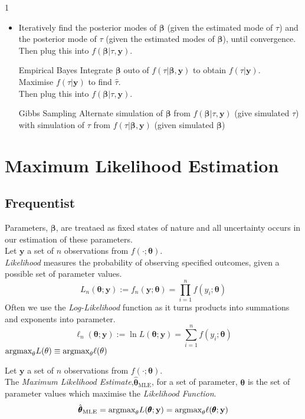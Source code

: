 \documentclass[11pt,a4paper]{article}
\begin{document}
1
\begin{itemize}
	\item Iteratively find the posterior modes of $\pmb\beta$ (given the estimated mode of $\tau$) and the posterior mode of $\tau$ (given the estimated modes of $\pmb\beta$), until convergence.\\
	Then plug this into $f(\pmb\beta|\tau,\textbf{y})$.
	\item[Empirical Bayes] Integrate $\pmb\beta$ outo of $f(\tau|\pmb\beta,\textbf{y})$ to obtain $f(\tau|\textbf{y})$.\\
	Maximise $f(\tau|\textbf{y})$ to find $\hat\tau$.\\
	Then plug this into $f(\pmb\beta|\tau,\textbf{y})$.
	\item[Gibbs Sampling] Alternate simulation of $\pmb\beta$ from $f(\pmb\beta|\tau,\textbf{y})$ (give simulated $\tau$) with simulation of $\tau$ from $f(\tau|\pmb\beta,\textbf{y})$ (given simulated $\pmb\beta$)
\end{itemize}

\section{Maximum Likelihood Estimation}

\subsection{Frequentist}

Parameters, $\pmb\beta$, are treataed as fixed states of nature and all uncertainty occurs in our estimation of these parameters.\\

Let $\textbf{y}$ a set of $n$ observations from $f(\cdot;\pmb\theta)$.\\
\textit{Likelihood} measures the probability of observing specified outcomes, given a possible set of parameter values.
$$L_n(\pmb\theta;\textbf{y}):=f_n(\textbf{y};\pmb\theta)=\prod_{i=1}^nf(y_i;\pmb\theta)$$
Often we use the \textit{Log-Likelihood} function as it turns products into summations and exponents into parameter.
$$\ell_n(\pmb\theta;\textbf{y}):=\ln L(\pmb\theta;\textbf{y})=\sum_{i=1}^nf(y_i;\pmb\theta)$$
\nb $\text{argmax}_\theta L(\theta)\equiv\text{argmax}_\theta \ell(\theta)$

Let $\textbf{y}$ a set of $n$ observations from $f(\cdot;\pmb\theta)$.\\
The \textit{Maximum Likelihood Estimate},$\hat{\pmb\theta}_\text{MLE}$, for a set of parameter, $\pmb\theta$ is the set of parameter values which maximise the \textit{Likelihood Function}.
$$\hat{\pmb\theta}_\text{MLE}=\text{argmax}_\theta L(\pmb\theta;\textbf{y})=\text{argmax}_\theta \ell(\pmb\theta;\textbf{y})$$
\end{document}
